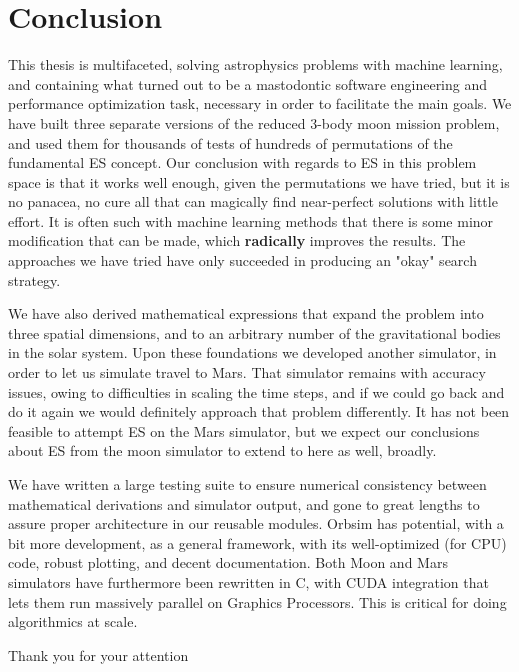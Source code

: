 
\chapter{Conclusion}
This thesis is multifaceted, solving astrophysics problems with machine learning, and containing what turned out to be a mastodontic software engineering and performance optimization task, necessary in order to facilitate the main goals. We have built three separate versions of the reduced 3-body moon mission problem, and used them for thousands of tests of hundreds of permutations of the fundamental ES concept. Our conclusion with regards to ES in this problem space is that it works well enough, given the permutations we have tried, but it is no panacea, no cure all that can magically find near-perfect solutions with little effort. It is often such with machine learning methods that there is some minor modification that can be made, which \textbf{radically} improves the results. The approaches we have tried have only succeeded in producing an "okay" search strategy. 

We have also derived mathematical expressions that expand the problem into three spatial dimensions, and to an arbitrary number of the gravitational bodies in the solar system. Upon these foundations we developed another simulator, in order to let us simulate travel to Mars. That simulator remains with accuracy issues, owing to difficulties in scaling the time steps, and if we could go back and do it again we would definitely approach that problem differently. It has not been feasible to attempt ES on the Mars simulator, but we expect our conclusions about ES from the moon simulator to extend to here as well, broadly.

We have written a large testing suite to ensure numerical consistency between mathematical derivations and simulator output, and gone to great lengths to assure proper architecture in our reusable modules. Orbsim has potential, with a bit more development, as a general framework, with its well-optimized (for CPU) code, robust plotting, and decent documentation. Both Moon and Mars simulators have furthermore been rewritten in C, with CUDA integration that lets them run massively parallel on Graphics Processors. This is critical for doing algorithmics at scale.

\LARGE{Thank you for your attention}
